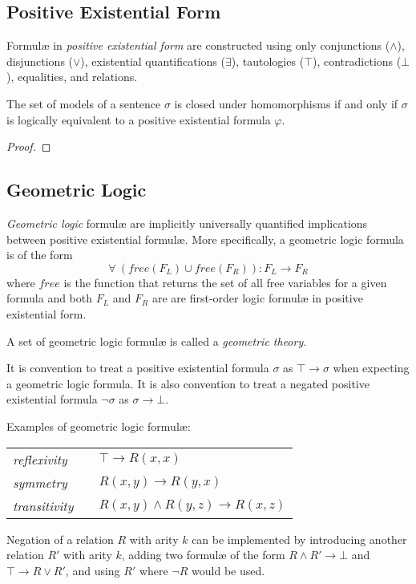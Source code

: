 	\subsection{Positive Existential Form}

		Formul{\ae} in \emph{positive existential form} are constructed using
		only conjunctions ($\wedge$), disjunctions ($\vee$), existential
		quantifications ($\exists$), tautologies ($\top$), contradictions
		($\bot$), equalities, and relations.

		\begin{theorem}
			The set of models of a sentence $\sigma$ is closed under homomorphisms
			if and only if $\sigma$ is logically equivalent to a positive
			existential formula $\varphi$.
		\end{theorem}

		\begin{proof}
			
		\end{proof}

	\subsection{Geometric Logic}

		\emph{Geometric logic} formul{\ae} are implicitly universally
		quantified implications between positive existential formul{\ae}. More
		specifically, a geometric logic formula is of the form
		\[\forall\ (free(F_L) \cup free(F_R)) : F_L \to F_R\]
		where $free$ is the function that returns the set of all free variables
		for a given formula and both $F_L$ and $F_R$ are are first-order logic
		formul{\ae} in positive existential form.

		A set of geometric logic formul{\ae} is called a \emph{geometric
		theory}.

		It is convention to treat a positive existential formula $\sigma$ as
		$\top \to \sigma$ when expecting a geometric logic formula. It is also
		convention to treat a negated positive existential formula $\neg\sigma$
		as $\sigma \to \bot$.

		Examples of geometric logic formul{\ae}:

		\begin{tabular}{lll}
		\emph{reflexivity}   & \qquad  &  $\top \to R(x,x)$                  \\
		\emph{symmetry}      & \qquad  &  $R(x,y) \to R(y,x)$                \\
		\emph{transitivity}  & \qquad  &  $R(x,y) \wedge R(y,z) \to R(x,z)$
		\end{tabular}

		Negation of a relation $R$ with arity $k$ can be implemented by
		introducing another relation $R'$ with arity $k$, adding two
		formul{\ae} of the form $R \wedge R' \to \bot$ and $\top \to R \vee
		R'$, and using $R'$ where $\neg R$ would be used.

